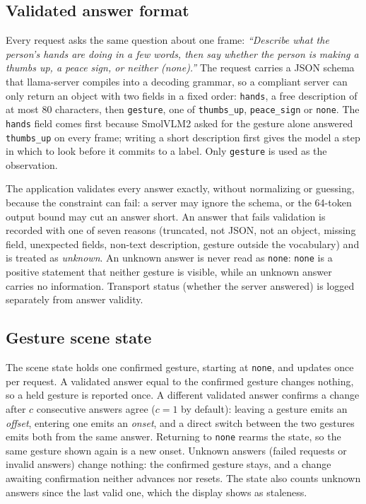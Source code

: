 \subsection{Validated answer format}
\label{sec:answers}
Every request asks the same question about one frame: \emph{``Describe what the person's hands are doing in a few words, then say whether the person is making a thumbs up, a peace sign, or neither (none).''}
The request carries a JSON schema that llama-server compiles into a decoding grammar, so a compliant server can only return an object with two fields in a fixed order: \texttt{hands}, a free description of at most 80 characters, then \texttt{gesture}, one of \texttt{thumbs\_up}, \texttt{peace\_sign} or \texttt{none}.
The \texttt{hands} field comes first because SmolVLM2 asked for the gesture alone answered \texttt{thumbs\_up} on every frame; writing a short description first gives the model a step in which to look before it commits to a label.
Only \texttt{gesture} is used as the observation.

The application validates every answer exactly, without normalizing or guessing, because the constraint can fail: a server may ignore the schema, or the 64-token output bound may cut an answer short.
An answer that fails validation is recorded with one of seven reasons (truncated, not JSON, not an object, missing field, unexpected fields, non-text description, gesture outside the vocabulary) and is treated as \emph{unknown}.
An unknown answer is never read as \texttt{none}: \texttt{none} is a positive statement that neither gesture is visible, while an unknown answer carries no information.
Transport status (whether the server answered) is logged separately from answer validity.

\subsection{Gesture scene state}
\label{sec:scene}
The scene state holds one confirmed gesture, starting at \texttt{none}, and updates once per request.
A validated answer equal to the confirmed gesture changes nothing, so a held gesture is reported once.
A different validated answer confirms a change after $c$ consecutive answers agree ($c=1$ by default): leaving a gesture emits an \emph{offset}, entering one emits an \emph{onset}, and a direct switch between the two gestures emits both from the same answer.
Returning to \texttt{none} rearms the state, so the same gesture shown again is a new onset.
Unknown answers (failed requests or invalid answers) change nothing: the confirmed gesture stays, and a change awaiting confirmation neither advances nor resets.
The state also counts unknown answers since the last valid one, which the display shows as staleness.

